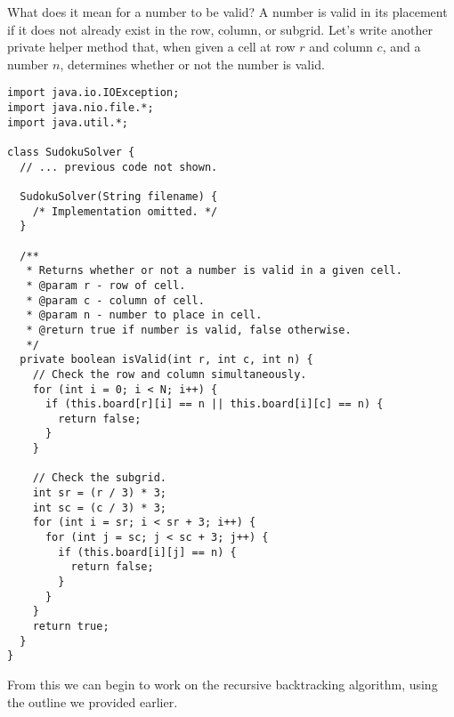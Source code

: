 What does it mean for a number to be valid? A number is valid in its placement if it does not already exist in the row, column, or subgrid. Let's write another private helper method that, when given a cell at row $r$ and column $c$, and a number $n$, determines whether or not the number is valid.

\begin{lstlisting}[language=MyJava]
import java.io.IOException;
import java.nio.file.*;
import java.util.*;

class SudokuSolver {
  // ... previous code not shown.

  SudokuSolver(String filename) { 
    /* Implementation omitted. */ 
  }

  /**
   * Returns whether or not a number is valid in a given cell.
   * @param r - row of cell.
   * @param c - column of cell.
   * @param n - number to place in cell.
   * @return true if number is valid, false otherwise.
   */ 
  private boolean isValid(int r, int c, int n) {
    // Check the row and column simultaneously.
    for (int i = 0; i < N; i++) {
      if (this.board[r][i] == n || this.board[i][c] == n) { 
        return false; 
      }
    }

    // Check the subgrid.
    int sr = (r / 3) * 3;
    int sc = (c / 3) * 3;
    for (int i = sr; i < sr + 3; i++) {
      for (int j = sc; j < sc + 3; j++) {
        if (this.board[i][j] == n) { 
          return false; 
        }
      }
    }
    return true;
  }
}
\end{lstlisting}

From this we can begin to work on the recursive backtracking algorithm, using the outline we provided earlier. 

